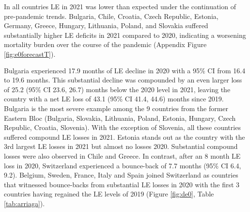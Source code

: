 \documentclass[12pt]{article}
\begin{document}
In all countries LE in 2021 was lower than expected under the continuation of pre-pandemic trends. Bulgaria, Chile, Croatia, Czech Republic, Estonia, Germany, Greece, Hungary, Lithuania, Poland, and Slovakia suffered substantially higher LE deficits in 2021 compared to 2020, indicating a worsening mortality burden over the course of the pandemic (Appendix Figure \ref{fig:e0forecastT}).

Bulgaria experienced 17.9 months of LE decline in 2020 with a 95\% CI from 16.4 to 19.6 months. This substantial decline was compounded by an even larger loss of 25.2 (95\% CI 23.6, 26.7) months below the 2020 level in 2021, leaving the country with a net LE loss of 43.1 (95\% CI 41.4, 44.6) months since 2019. Bulgaria is the most severe example among the 9 countries from the former Eastern Bloc (Bulgaria, Slovakia, Lithuania, Poland, Estonia, Hungary, Czech Republic, Croatia, Slovenia). With the exception of Slovenia, all these countries suffered compound LE losses in 2021. Estonia stands out as the country with the 3rd largest LE losses in 2021 but almost no losses 2020. Substantial compound losses were also observed in Chile and Greece. In contrast, after an 8 month LE loss in 2020, Switzerland experienced a bounce-back of 7.7 months (95\% CI 6.4, 9.2). Belgium, Sweden, France, Italy and Spain joined Switzerland as countries that witnessed bounce-backs from substantial LE losses in 2020 with the first 3 countries having regained the LE levels of 2019 (Figure \ref{fig:de0}, Table \ref{tab:arriaga}).
\end{document}
